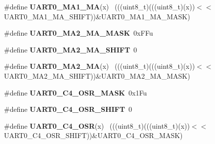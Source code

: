 \begin{DoxyCompactItemize}
\item 
\hypertarget{group___u_a_r_t0___register___masks_ga957c306f9ef6bcd62bf951e3435a22ac}{}\#define {\bfseries U\+A\+R\+T0\+\_\+\+M\+A1\+\_\+\+M\+A}(x)                                                ~(((uint8\+\_\+t)(((uint8\+\_\+t)(x))$<$$<$U\+A\+R\+T0\+\_\+\+M\+A1\+\_\+\+M\+A\+\_\+\+S\+H\+I\+F\+T))\&U\+A\+R\+T0\+\_\+\+M\+A1\+\_\+\+M\+A\+\_\+\+M\+A\+S\+K)\label{group___u_a_r_t0___register___masks_ga957c306f9ef6bcd62bf951e3435a22ac}

\item 
\hypertarget{group___u_a_r_t0___register___masks_ga92464fbb6ee7662411228e760fab58d3}{}\#define {\bfseries U\+A\+R\+T0\+\_\+\+M\+A2\+\_\+\+M\+A\+\_\+\+M\+A\+S\+K}~0x\+F\+Fu\label{group___u_a_r_t0___register___masks_ga92464fbb6ee7662411228e760fab58d3}

\item 
\hypertarget{group___u_a_r_t0___register___masks_gab09c5cd573077ea52dd66656d8b4157d}{}\#define {\bfseries U\+A\+R\+T0\+\_\+\+M\+A2\+\_\+\+M\+A\+\_\+\+S\+H\+I\+F\+T}~0\label{group___u_a_r_t0___register___masks_gab09c5cd573077ea52dd66656d8b4157d}

\item 
\hypertarget{group___u_a_r_t0___register___masks_ga36b5600f974f12858e2a993ddf588ef2}{}\#define {\bfseries U\+A\+R\+T0\+\_\+\+M\+A2\+\_\+\+M\+A}(x)                                                ~(((uint8\+\_\+t)(((uint8\+\_\+t)(x))$<$$<$U\+A\+R\+T0\+\_\+\+M\+A2\+\_\+\+M\+A\+\_\+\+S\+H\+I\+F\+T))\&U\+A\+R\+T0\+\_\+\+M\+A2\+\_\+\+M\+A\+\_\+\+M\+A\+S\+K)\label{group___u_a_r_t0___register___masks_ga36b5600f974f12858e2a993ddf588ef2}

\item 
\hypertarget{group___u_a_r_t0___register___masks_gaf0fa80f61dd1507cc4e5383553ec1182}{}\#define {\bfseries U\+A\+R\+T0\+\_\+\+C4\+\_\+\+O\+S\+R\+\_\+\+M\+A\+S\+K}~0x1\+Fu\label{group___u_a_r_t0___register___masks_gaf0fa80f61dd1507cc4e5383553ec1182}

\item 
\hypertarget{group___u_a_r_t0___register___masks_ga4c95a628d79af511aa40f6dfca1bb7f5}{}\#define {\bfseries U\+A\+R\+T0\+\_\+\+C4\+\_\+\+O\+S\+R\+\_\+\+S\+H\+I\+F\+T}~0\label{group___u_a_r_t0___register___masks_ga4c95a628d79af511aa40f6dfca1bb7f5}

\item 
\hypertarget{group___u_a_r_t0___register___masks_ga762dbebb5b684005e64f4b16a30d2a86}{}\#define {\bfseries U\+A\+R\+T0\+\_\+\+C4\+\_\+\+O\+S\+R}(x)                                                ~(((uint8\+\_\+t)(((uint8\+\_\+t)(x))$<$$<$U\+A\+R\+T0\+\_\+\+C4\+\_\+\+O\+S\+R\+\_\+\+S\+H\+I\+F\+T))\&U\+A\+R\+T0\+\_\+\+C4\+\_\+\+O\+S\+R\+\_\+\+M\+A\+S\+K)\label{group___u_a_r_t0___register___masks_ga762dbebb5b684005e64f4b16a30d2a86}


\end{DoxyCompactItemize}
